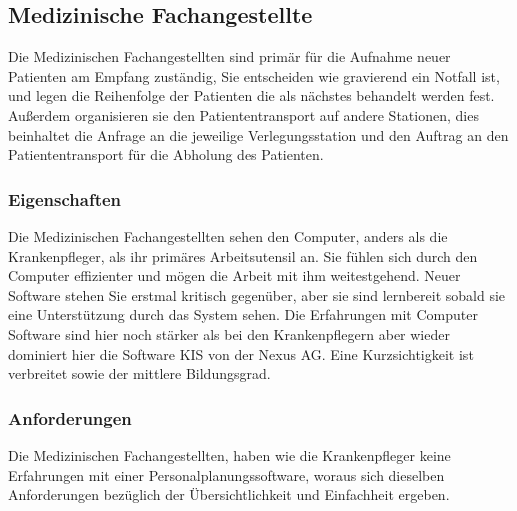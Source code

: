 \documentclass[11pt,
paper=a4,
bibtotocnumbered,	  %
liststotocnumbered,  %
DIV=calc,		  %
tablecaptionabove,	  %
headinclude,
]{article}
\begin{document}
\subsection{Medizinische Fachangestellte}
Die Medizinischen Fachangestellten sind primär für die Aufnahme neuer Patienten am Empfang zuständig, Sie entscheiden wie gravierend ein Notfall ist, und legen die Reihenfolge der Patienten die als nächstes behandelt werden fest. Außerdem organisieren sie den Patiententransport auf andere Stationen, dies beinhaltet die Anfrage an die jeweilige Verlegungsstation und den Auftrag an den Patiententransport für die Abholung des Patienten. 
\subsubsection{Eigenschaften}
Die Medizinischen Fachangestellten sehen den Computer, anders als die Krankenpfleger, als ihr primäres Arbeitsutensil an. Sie fühlen sich durch den Computer effizienter und mögen die Arbeit mit ihm weitestgehend. Neuer Software stehen Sie erstmal kritisch gegenüber, aber sie sind lernbereit sobald sie eine Unterstützung durch das System sehen. Die Erfahrungen mit Computer Software sind hier noch stärker als bei den Krankenpflegern aber wieder dominiert hier die Software KIS von der Nexus AG. Eine Kurzsichtigkeit ist verbreitet sowie der mittlere Bildungsgrad.
\subsubsection{Anforderungen}
Die Medizinischen Fachangestellten, haben wie die Krankenpfleger keine Erfahrungen mit einer Personalplanungssoftware, woraus sich dieselben Anforderungen bezüglich der Übersichtlichkeit und Einfachheit ergeben.
\end{document}
